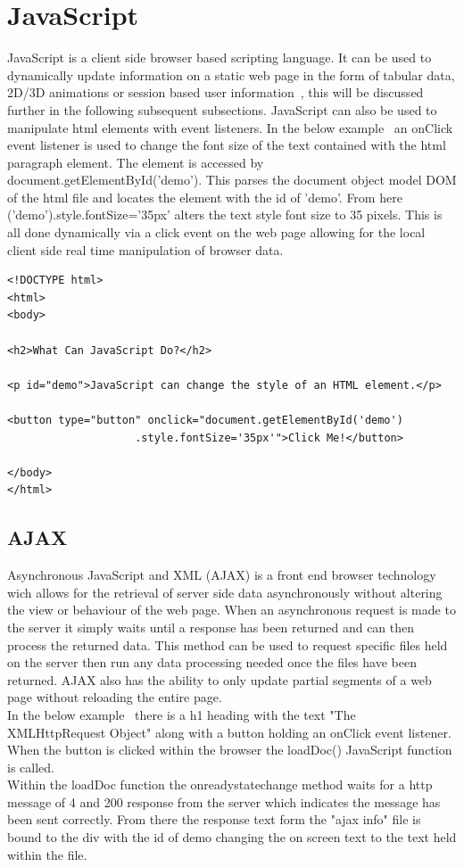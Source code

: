 \section{JavaScript}
JavaScript is a client side browser based scripting language.
It can be used to dynamically update information on a static web page in the form of tabular data, 2D/3D animations or session based user information~\cite{JavaScri52:online}, this will be discussed further in the following subsequent subsections. JavaScript can also be used to manipulate html elements with event listeners. In the below example~\cite{fontSize:online} an onClick event listener is used to change the font size of the text contained with the html paragraph element. The element is accessed by document.getElementById('demo'). This parses the document object model DOM of the html file and locates the element with the id of 'demo'. From here  ('demo').style.fontSize='35px' alters the text style font size to 35 pixels.
This is all done dynamically via a click event on the web page allowing for the local client side real time manipulation of browser data.
\begin{verbatim}
<!DOCTYPE html>
<html>
<body>

<h2>What Can JavaScript Do?</h2>

<p id="demo">JavaScript can change the style of an HTML element.</p>

<button type="button" onclick="document.getElementById('demo')
                    .style.fontSize='35px'">Click Me!</button>

</body>
</html> 
\end{verbatim}  
\subsection{AJAX}
Asynchronous JavaScript and XML (AJAX) is a front end browser technology wich allows for the retrieval of server side data asynchronously without altering the view or behaviour of the web page. When an asynchronous request is made to the server it simply waits until a response has been returned and can then process the returned data. This method can be used to request specific files held on the server then run any data processing needed once the files have been returned.  AJAX also has the ability to only update partial segments of a web page without reloading the entire page.~\cite{AJAX:online}\\
In the below example~\cite{AJAXDemo:online} there is a h1 heading with the text "The XMLHttpRequest Object" along with a button holding an onClick event listener. When the button is clicked within the browser the loadDoc() JavaScript function is called.\\
Within the loadDoc function the onreadystatechange method waits for a http message of 4 and 200 response from the server which indicates the message has been sent correctly. From there the response text form the "ajax info" file is bound to the div with the id of demo changing the on screen text to the text held within the file.\\
 
